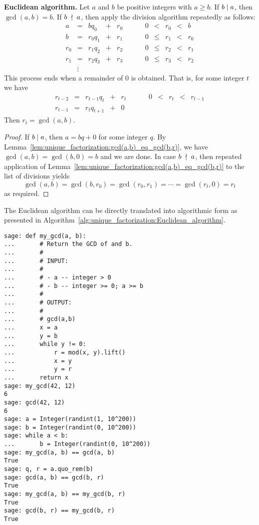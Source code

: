 \begin{theorem}
\label{thm:unique_factorization:Euclidean_algorithm}
\textbf{Euclidean algorithm.}
Let $a$ and $b$ be positive integers with $a \geq b$. If $b \;|\; a$,
then $\gcd(a,b) = b$. If $b \;\nmid\; a$, then apply the division
algorithm repeatedly as follows:
\[
\begin{array}{rclclccccrclcl}
a   &=& bq_0    &+& r_0 &&&& 0 &<&    r_0 &<& b \\
b   &=& r_0 q_1 &+& r_1 &&&& 0 &\leq& r_1 &<& r_0 \\
r_0 &=& r_1 q_2 &+& r_2 &&&& 0 &\leq& r_2 &<& r_1 \\
r_1 &=& r_2 q_3 &+& r_3 &&&& 0 &\leq& r_3 &<& r_2 \\
& \vdots
\end{array}
\]
This process ends when a remainder of $0$ is obtained. That is,
for some integer $t$ we have
\[
\begin{array}{rclclccccrclcl}
r_{t-2} &=& r_{t-1} q_t &+& r_t &&&& 0 &<& r_t &<& r_{t-1} \\
r_{t-1} &=& r_t q_{t+1} &+& 0
\end{array}
\]
Then $r_t = \gcd(a,b)$.
\end{theorem}

\begin{proof}
If $b \;|\; a$, then $a = bq + 0$ for some integer $q$. By
Lemma~\ref{lem:unique_factorization:gcd(a,b)_eq_gcd(b,r)}, we have
$\gcd(a,b) = \gcd(b,0) = b$ and we are done. In case
$b \;\nmid\; a$, then repeated application of
Lemma~\ref{lem:unique_factorization:gcd(a,b)_eq_gcd(b,r)} to the list
of divisions yields
\[
\gcd(a,b)
=
\gcd(b, r_0)
=
\gcd(r_0, r_1)
=
\cdots
=
\gcd(r_t, 0)
=
r_t
\]
as required.
\end{proof}

The Euclidean algorithm can be directly translated into algorithmic
form as presented in
Algorithm~\ref{alg:unique_factorization:Euclidean_algorithm}.

\begin{lstlisting}
sage: def my_gcd(a, b):
...       # Return the GCD of and b.
...       #
...       # INPUT:
...       #
...       # - a -- integer > 0
...       # - b -- integer >= 0; a >= b
...       #
...       # OUTPUT:
...       #
...       # gcd(a,b)
...       x = a
...       y = b
...       while y != 0:
...           r = mod(x, y).lift()
...           x = y
...           y = r
...       return x
sage: my_gcd(42, 12)
6
sage: gcd(42, 12)
6
sage: a = Integer(randint(1, 10^200))
sage: b = Integer(randint(0, 10^200))
sage: while a < b:
...       b = Integer(randint(0, 10^200))
sage: my_gcd(a, b) == gcd(a, b)
True
sage: q, r = a.quo_rem(b)
sage: gcd(a, b) == gcd(b, r)
True
sage: my_gcd(a, b) == my_gcd(b, r)
True
sage: gcd(b, r) == my_gcd(b, r)
True
\end{lstlisting}

